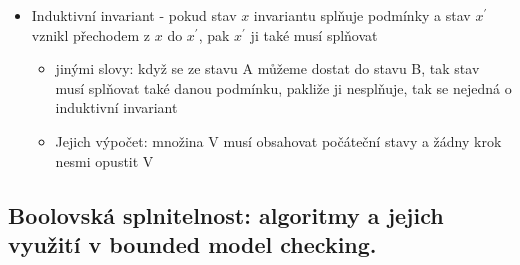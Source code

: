 \documentclass[a4paper,hidelinks]{article}
\begin{document}
\begin{itemize}
\begin{itemize}
        \item Induktivní invariant - pokud stav $x$ invariantu splňuje podmínky a stav $x^\prime$ vznikl přechodem z $x$ do $x^\prime$, pak $x^\prime$ ji také musí splňovat
        \begin{itemize}
            \item jinými slovy: když se ze stavu A můžeme dostat do stavu B, tak stav musí splňovat také danou podmínku, pakliže ji nesplňuje, tak se nejedná o induktivní invariant
            \item Jejich výpočet: množina V musí obsahovat počáteční stavy a žádny krok nesmi opustit V
        \end{itemize}
    \end{itemize}
\end{itemize}


\subsection{Boolovská splnitelnost: algoritmy a jejich využití v bounded model checking.}
\end{document}

